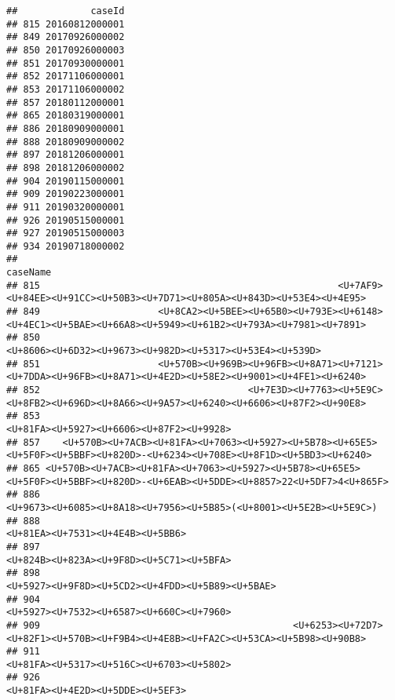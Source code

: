 \documentclass[
]{article}
\begin{document}
\begin{verbatim}
##             caseId
## 815 20160812000001
## 849 20170926000002
## 850 20170926000003
## 851 20170930000001
## 852 20171106000001
## 853 20171106000002
## 857 20180112000001
## 865 20180319000001
## 886 20180909000001
## 888 20180909000002
## 897 20181206000001
## 898 20181206000002
## 904 20190115000001
## 909 20190223000001
## 911 20190320000001
## 926 20190515000001
## 927 20190515000003
## 934 20190718000002
##                                                                                                                         caseName
## 815                                                     <U+7AF9><U+84EE><U+91CC><U+50B3><U+7D71><U+805A><U+843D><U+53E4><U+4E95>
## 849                     <U+8CA2><U+5BEE><U+65B0><U+793E><U+6148><U+4EC1><U+5BAE><U+66A8><U+5949><U+61B2><U+793A><U+7981><U+7891>
## 850                                                                     <U+8606><U+6D32><U+9673><U+982D><U+5317><U+53E4><U+539D>
## 851                     <U+570B><U+969B><U+96FB><U+8A71><U+7121><U+7DDA><U+96FB><U+8A71><U+4E2D><U+58E2><U+9001><U+4FE1><U+6240>
## 852                                     <U+7E3D><U+7763><U+5E9C><U+8FB2><U+696D><U+8A66><U+9A57><U+6240><U+6606><U+87F2><U+90E8>
## 853                                                                                     <U+81FA><U+5927><U+6606><U+87F2><U+9928>
## 857    <U+570B><U+7ACB><U+81FA><U+7063><U+5927><U+5B78><U+65E5><U+5F0F><U+5BBF><U+820D>-<U+6234><U+708E><U+8F1D><U+5BD3><U+6240>
## 865 <U+570B><U+7ACB><U+81FA><U+7063><U+5927><U+5B78><U+65E5><U+5F0F><U+5BBF><U+820D>-<U+6EAB><U+5DDE><U+8857>22<U+5DF7>4<U+865F>
## 886                                                           <U+9673><U+6085><U+8A18><U+7956><U+5B85>(<U+8001><U+5E2B><U+5E9C>)
## 888                                                                                             <U+81EA><U+7531><U+4E4B><U+5BB6>
## 897                                                                                     <U+824B><U+823A><U+9F8D><U+5C71><U+5BFA>
## 898                                                                             <U+5927><U+9F8D><U+5CD2><U+4FDD><U+5B89><U+5BAE>
## 904                                                                                     <U+5927><U+7532><U+6587><U+660C><U+7960>
## 909                                             <U+6253><U+72D7><U+82F1><U+570B><U+F9B4><U+4E8B><U+FA2C><U+53CA><U+5B98><U+90B8>
## 911                                                                                     <U+81FA><U+5317><U+516C><U+6703><U+5802>
## 926                                                                                             <U+81FA><U+4E2D><U+5DDE><U+5EF3>

\end{verbatim}
\end{document}
